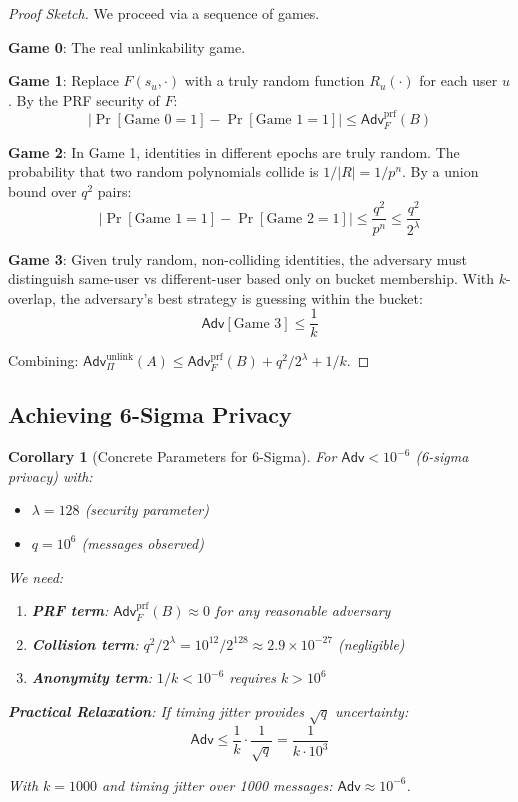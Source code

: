 \documentclass[11pt]{article}
\newtheorem{corollary}[theorem]{Corollary}
\newcommand{\Adv}{\mathsf{Adv}}
\begin{document}
\begin{proof}[Proof Sketch]
We proceed via a sequence of games.

\textbf{Game 0}: The real unlinkability game.

\textbf{Game 1}: Replace $F(s_u, \cdot)$ with a truly random function $R_u(\cdot)$ for each user $u$.
By the PRF security of $F$:
\[
|\Pr[\text{Game 0} = 1] - \Pr[\text{Game 1} = 1]| \leq \Adv^{\text{prf}}_F(B)
\]

\textbf{Game 2}: In Game 1, identities in different epochs are truly random.
The probability that two random polynomials collide is $1/|R| = 1/p^n$.
By a union bound over $q^2$ pairs:
\[
|\Pr[\text{Game 1} = 1] - \Pr[\text{Game 2} = 1]| \leq \frac{q^2}{p^n} \leq \frac{q^2}{2^{\lambda}}
\]

\textbf{Game 3}: Given truly random, non-colliding identities, the adversary must distinguish
same-user vs different-user based only on bucket membership. With $k$-overlap, the adversary's
best strategy is guessing within the bucket:
\[
\Adv[\text{Game 3}] \leq \frac{1}{k}
\]

Combining: $\Adv^{\text{unlink}}_{\Pi}(A) \leq \Adv^{\text{prf}}_F(B) + q^2/2^{\lambda} + 1/k$.
\end{proof}

\subsection{Achieving 6-Sigma Privacy}

\begin{corollary}[Concrete Parameters for 6-Sigma]
\label{cor:sixsigma}
For $\Adv < 10^{-6}$ (6-sigma privacy) with:
\begin{itemize}
    \item $\lambda = 128$ (security parameter)
    \item $q = 10^6$ (messages observed)
\end{itemize}

We need:
\begin{enumerate}
    \item \textbf{PRF term}: $\Adv^{\text{prf}}_F(B) \approx 0$ for any reasonable adversary

    \item \textbf{Collision term}: $q^2/2^{\lambda} = 10^{12}/2^{128} \approx 2.9 \times 10^{-27}$ (negligible)

    \item \textbf{Anonymity term}: $1/k < 10^{-6}$ requires $k > 10^6$
\end{enumerate}

\textbf{Practical Relaxation}: If timing jitter provides $\sqrt{q}$ uncertainty:
\[
\Adv \leq \frac{1}{k} \cdot \frac{1}{\sqrt{q}} = \frac{1}{k \cdot 10^3}
\]

With $k = 1000$ and timing jitter over 1000 messages: $\Adv \approx 10^{-6}$.
\end{corollary}
\end{document}
